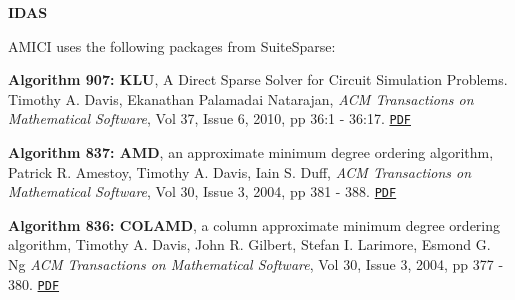 {\bfseries I\+D\+AS}

A\+M\+I\+CI uses the following packages from Suite\+Sparse\+:

{\bfseries Algorithm 907\+: K\+LU}, A Direct Sparse Solver for Circuit Simulation Problems. Timothy A. Davis, Ekanathan Palamadai Natarajan, {\itshape A\+CM Transactions on Mathematical Software}, Vol 37, Issue 6, 2010, pp 36\+:1 -\/ 36\+:17. \href{http://dl.acm.org/authorize?305534}{\tt P\+DF}

{\bfseries Algorithm 837\+: A\+MD}, an approximate minimum degree ordering algorithm, Patrick R. Amestoy, Timothy A. Davis, Iain S. Duff, {\itshape A\+CM Transactions on Mathematical Software}, Vol 30, Issue 3, 2004, pp 381 -\/ 388. \href{http://dl.acm.org/authorize?733169}{\tt P\+DF}

{\bfseries Algorithm 836\+: C\+O\+L\+A\+MD}, a column approximate minimum degree ordering algorithm, Timothy A. Davis, John R. Gilbert, Stefan I. Larimore, Esmond G. Ng {\itshape A\+CM Transactions on Mathematical Software}, Vol 30, Issue 3, 2004, pp 377 -\/ 380. \href{http://dl.acm.org/authorize?734450}{\tt P\+DF} 